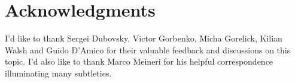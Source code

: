 \documentclass[%
 reprint,
 amsmath,amssymb,
 aps,
]{revtex4-1}
\begin{document}
\section{Acknowledgments}
I'd like to thank Sergei Dubovsky, Victor Gorbenko, Micha Gorelick, Kilian Walsh and Guido D'Amico for their valuable feedback and discussions on this topic.
I'd also like to thank Marco Meineri for his helpful correspondence illuminating many subtleties.


\end{document}
